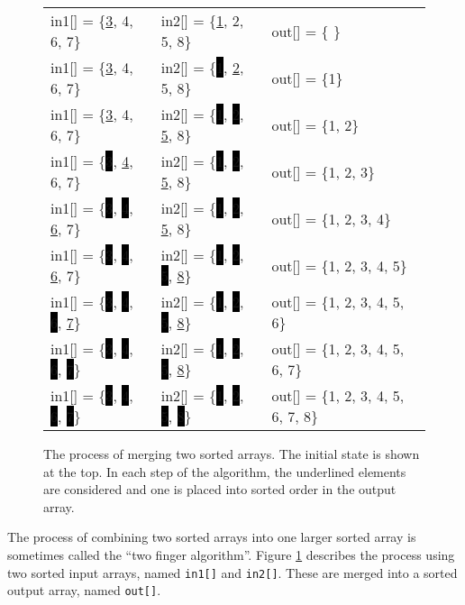 \begin{figure}
\centering
\setlength{\fboxsep}{0pt}
\begin{tabular} {l l l } 
in1[] = \{\underline{3}, 4, 6, 7\} & in2[] = \{\underline{1}, 2, 5, 8\} & out[] = \{ \} \\
in1[] = \{\underline{3}, 4, 6, 7\} & in2[] = \{\colorbox{black}{1}, \underline{2}, 5, 8\}  & out[] = \{1\} \\
in1[] = \{\underline{3}, 4, 6, 7\} & in2[] = \{\colorbox{black}{1}, \colorbox{black}{2}, \underline{5}, 8\} & out[] = \{1, 2\} \\
in1[] = \{\colorbox{black}{3}, \underline{4}, 6, 7\} & in2[] = \{\colorbox{black}{1}, \colorbox{black}{2}, \underline{5}, 8\} & out[] = \{1, 2, 3\} \\
in1[] = \{\colorbox{black}{3}, \colorbox{black}{4}, \underline{6}, 7\} & in2[] = \{\colorbox{black}{1}, \colorbox{black}{2}, \underline{5}, 8\}  & out[] = \{1, 2, 3, 4\} \\
in1[] = \{\colorbox{black}{3}, \colorbox{black}{4}, \underline{6}, 7\} & in2[] = \{\colorbox{black}{1}, \colorbox{black}{2}, \colorbox{black}{5}, \underline{8}\}  & out[] = \{1, 2, 3, 4, 5\} \\
in1[] = \{\colorbox{black}{3}, \colorbox{black}{4}, \colorbox{black}{6}, \underline{7}\}  & in2[] = \{\colorbox{black}{1}, \colorbox{black}{2}, \colorbox{black}{5}, \underline{8}\}  &out[] = \{1, 2, 3, 4, 5, 6\} \\
in1[] = \{\colorbox{black}{3}, \colorbox{black}{4}, \colorbox{black}{6}, \colorbox{black}{7}\}  & in2[] = \{\colorbox{black}{1}, \colorbox{black}{2}, \colorbox{black}{5}, \underline{8}\}  &out[] = \{1, 2, 3, 4, 5, 6, 7\} \\
in1[] = \{\colorbox{black}{3}, \colorbox{black}{4}, \colorbox{black}{6}, \colorbox{black}{7}\}  & in2[] = \{\colorbox{black}{1}, \colorbox{black}{2}, \colorbox{black}{5}, \colorbox{black}{8}\} &out[] = \{1, 2, 3, 4, 5, 6, 7, 8\} \\
\end{tabular}
\caption{The process of merging two sorted arrays.  The initial state is shown at the top.  In each step of the algorithm, the underlined elements are considered and one is placed into sorted order in the output array.}
\label{fig:merge_behavior}
\end{figure}

The process of combining two sorted arrays into one larger sorted array is sometimes called the ``two finger algorithm''.  Figure \ref{fig:merge_behavior} describes the process using two sorted input arrays, named \lstinline{in1[]} and \lstinline{in2[]}. These are merged into a sorted output array, named \lstinline{out[]}.

